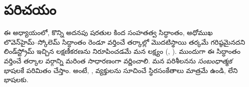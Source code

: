 \documentclass[../../../include/open-logic-section]{subfiles}
\begin{document}
\section{పరిచయం}

ఈ అధ్యాయంలో, కొన్ని అదనపు షరతుల కింద సంహతత్వ సిద్ధాంతం, అధోముఖ
లొవెన్‌హైమ్--స్కోలెమ్ సిద్ధాంతం రెండూ వర్తించే తర్కాల్లో మొదటిస్థాయి
తర్కమే గరిష్ఠమైనదని లిండ్‌స్ట్రోమ్ ఇచ్చిన లక్షణీకరణను నిరూపించడమే
మన లక్ష్యం
(,
). ముందుగా ఈ సిద్ధాంతం వర్తించే
తర్కాల వర్గాన్ని మరింత సాధారణంగా వర్ణించాలి. మన
పరిశీలనను \emph{సంబంధాత్మక} భాషలకే పరిమితం చేస్తాం. అంటే,
, వ్యక్తులను సూచించే స్థిరసంకేతాలు
మాత్రమే ఉండి,  లేని భాషలకు.
\end{document}

